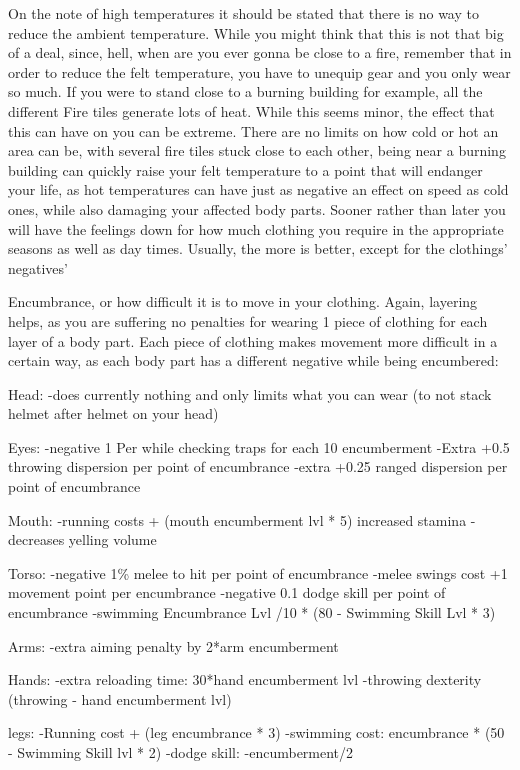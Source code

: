 On the note of high temperatures it should be stated that there is no way to reduce the ambient temperature. While you might think that this is not that big of a deal, since, hell, when are you ever gonna be close to a fire, remember that in order to reduce the felt temperature, you have to unequip gear and you only wear so much. If you were to stand close to a burning building for example, all the different Fire tiles generate lots of heat. While this seems minor, the effect that this can have on you can be extreme. There are no limits on how cold or hot an area can be, with several fire tiles stuck close to each other, being near a burning building can quickly raise your felt temperature to a point that will endanger your life, as hot temperatures can have just as negative an effect on speed as cold ones, while also damaging your affected body parts. Sooner rather than later you will have the feelings down for how much clothing you require in the appropriate seasons as well as day times. Usually, the more is better, except for the clothings' negatives'

Encumbrance, or how difficult it is to move in your clothing. Again, layering helps, as you are suffering no penalties for wearing 1 piece of clothing for each layer of a body part. Each piece of clothing makes movement more difficult in a certain way, as each body part has a different negative while being encumbered:

Head:
-does currently nothing and only limits what you can wear (to not stack helmet after helmet on your head)

Eyes:
-negative 1 Per while checking traps for each 10 encumberment
-Extra +0.5 throwing dispersion per point of encumbrance
-extra +0.25 ranged dispersion per point of encumbrance

Mouth:
-running costs + (mouth encumberment lvl * 5) increased stamina
-decreases yelling volume

Torso:
-negative 1\% melee to hit per point of encumbrance
-melee swings cost +1 movement point per encumbrance
-negative 0.1 dodge skill per point of encumbrance
-swimming Encumbrance Lvl /10 * (80 - Swimming Skill Lvl * 3)

Arms:
-extra aiming penalty by 2*arm encumberment

Hands:
-extra reloading time: 30*hand encumberment lvl
-throwing dexterity (throwing - hand encumberment lvl)

legs:
-Running cost + (leg encumbrance * 3)
-swimming cost: encumbrance * (50 - Swimming Skill lvl * 2)
-dodge skill: -encumberment/2

